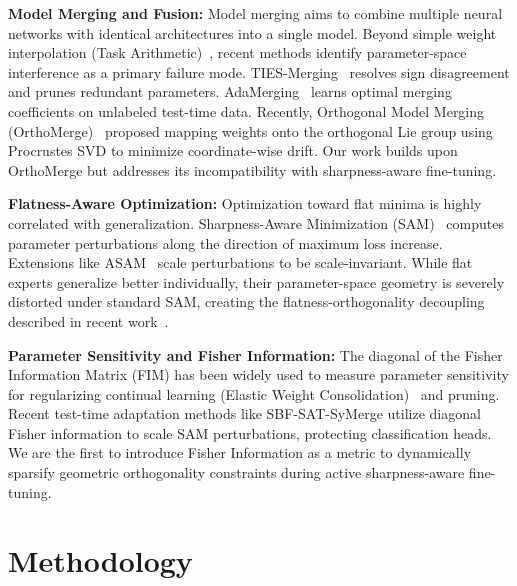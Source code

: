 \documentclass{article}
\theoremstyle{plain}
\theoremstyle{definition}
\theoremstyle{remark}
\begin{document}
\textbf{Model Merging and Fusion:} Model merging aims to combine multiple neural networks with identical architectures into a single model. Beyond simple weight interpolation (Task Arithmetic)~\cite{ilharco2022editing,wortsman2022model}, recent methods identify parameter-space interference as a primary failure mode. TIES-Merging~\cite{yadav2023ties} resolves sign disagreement and prunes redundant parameters. AdaMerging~\cite{yang2023adamerging} learns optimal merging coefficients on unlabeled test-time data. Recently, Orthogonal Model Merging (OrthoMerge)~\cite{yang2026orthogonal} proposed mapping weights onto the orthogonal Lie group using Procrustes SVD to minimize coordinate-wise drift. Our work builds upon OrthoMerge but addresses its incompatibility with sharpness-aware fine-tuning.

\textbf{Flatness-Aware Optimization:} Optimization toward flat minima is highly correlated with generalization. Sharpness-Aware Minimization (SAM)~\cite{foret2021sharpness,andriushchenko2022towards} computes parameter perturbations along the direction of maximum loss increase. Extensions like ASAM~\cite{liu2022towards} scale perturbations to be scale-invariant. While flat experts generalize better individually, their parameter-space geometry is severely distorted under standard SAM, creating the flatness-orthogonality decoupling described in recent work~\cite{yang2026orthogonal}.

\textbf{Parameter Sensitivity and Fisher Information:} The diagonal of the Fisher Information Matrix (FIM) has been widely used to measure parameter sensitivity for regularizing continual learning (Elastic Weight Consolidation)~\cite{sung2023empirical} and pruning. Recent test-time adaptation methods like SBF-SAT-SyMerge utilize diagonal Fisher information to scale SAM perturbations, protecting classification heads. We are the first to introduce Fisher Information as a metric to dynamically sparsify geometric orthogonality constraints during active sharpness-aware fine-tuning.

\section{Methodology}
\label{sec:method}
\end{document}
